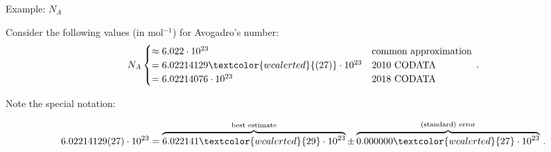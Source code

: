 \documentclass[aspectratio=1610]{beamer}
\begin{document}
\begin{frame}{Example: $N_A$}

Consider the following values (in mol$^{-1}$) for Avogadro's number:
\begin{align*}
  N_A  \begin{cases}
      \approx 6.022\cdot 10^{23} & \text{common approximation} \\
      = 6.02214129\textcolor{wcalerted}{(27)}\cdot 10^{23} & \text{2010 CODATA} \\
      = 6.02214076    \cdot 10^{23} & \text{2018 CODATA}  \\
  \end{cases} \, .
\end{align*} 
\pause  
\vfill 

Note the special notation:
 
\begin{equation*}
    6.02214129(27)\cdot 10^{23} = 
     \overbrace{6.022141\textcolor{wcalerted}{29}\cdot 10^{23}}^{\text{best estimate}} \pm \overbrace{0.000000\textcolor{wcalerted}{27}\cdot 10^{23}}^{\text{(standard) error}} \, .
\end{equation*}

\end{frame}
\end{document}
